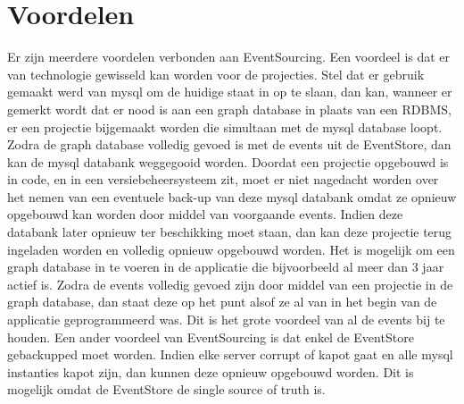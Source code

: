 
\chapter{Voordelen}
\label{ch:voordelen}

Er zijn meerdere voordelen verbonden aan EventSourcing. Een voordeel is dat er van technologie gewisseld kan worden voor de projecties. Stel dat er gebruik gemaakt werd van \gls{mysql} om de huidige staat in op te slaan, dan kan, wanneer er gemerkt wordt dat er nood is aan een \gls{graph} database in plaats van een \glsdesc{RDBMS}, er een projectie bijgemaakt worden die simultaan met de \gls{mysql} database loopt. Zodra de \gls{graph} database volledig gevoed is met de events uit de EventStore, dan kan de \gls{mysql} databank weggegooid worden. Doordat een projectie opgebouwd is in code, en in een versiebeheersysteem zit, moet er niet nagedacht worden over het nemen van een eventuele back-up van deze \gls{mysql} databank omdat ze opnieuw opgebouwd kan worden door middel van voorgaande events. Indien deze databank later opnieuw ter beschikking moet staan, dan kan deze projectie terug ingeladen worden en volledig opnieuw opgebouwd worden.
Het is mogelijk om een \gls{graph} database in te voeren in de applicatie die bijvoorbeeld al meer dan 3 jaar actief is. Zodra de events volledig gevoed zijn door middel van een projectie in de \gls{graph} database, dan staat deze op het punt alsof ze al van in het begin van de applicatie geprogrammeerd was. Dit is het grote voordeel van al de events bij te houden.
Een ander voordeel van EventSourcing is dat enkel de EventStore gebackupped moet worden. Indien elke server corrupt of kapot gaat en alle \gls{mysql} instanties kapot zijn, dan kunnen deze opnieuw opgebouwd worden. Dit is mogelijk omdat de EventStore de single source of truth is.